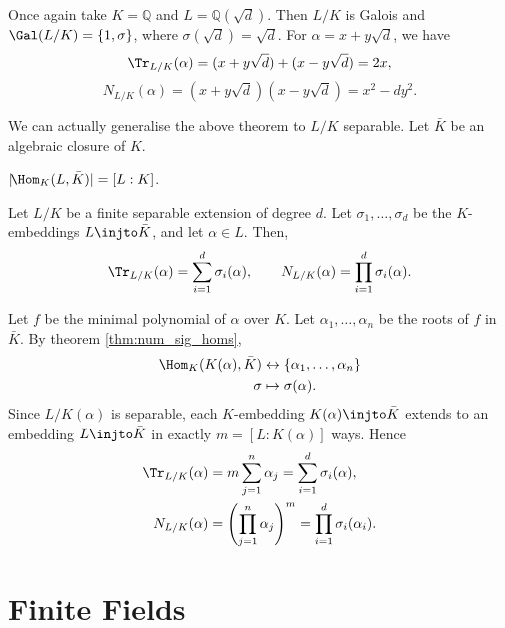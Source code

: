 \documentclass[12pt]{article}
\begin{document}
\begin{exbox}
	Once again take $K = \mathbb{Q}$ and $L = \mathbb{Q}(\sqrt d)$. Then $L/K$ is Galois and $\Gal(L/K) = \{1, \sigma\}$, where $\sigma(\sqrt d) = \sqrt d$. For $\alpha = x + y \sqrt d$, we have
	\[
	\Tr_{L/K}(\alpha) = (x + y \sqrt d) + (x - y \sqrt d) = 2x,
	\]
	\[
	N_{L/K}(\alpha) = (x + y \sqrt d)(x - y \sqrt d) = x^2 - dy^2.
	\]
\end{exbox}

We can actually generalise the above theorem to $L/K$ separable. Let $\bar K$ be an algebraic closure of $K$.


\begin{corollary}
	$|\!\Hom_K(L,\bar K)| = [L:K]$.
\end{corollary}

\begin{theorem}
	Let $L/K$ be a finite separable extension of degree $d$. Let $\sigma_1, \ldots, \sigma_d$ be the $K$-embeddings $L \injto \bar K$, and let $\alpha \in L$. Then,
	\[
	\Tr_{L/K}(\alpha) = \sum_{i = 1}^{d} \sigma_i(\alpha), \qquad N_{L/K}(\alpha) = \prod_{i = 1}^{d} \sigma_i(\alpha).
	\]
\end{theorem}

\begin{proofbox}
	Let $f$ be the minimal polynomial of $\alpha$ over $K$. Let $\alpha_1, \ldots, \alpha_n$ be the roots of $f$ in $\bar K$. By theorem \ref{thm:num_sig_homs},
	\begin{align*}
		\Hom_K(K(\alpha), \bar K) &\leftrightarrow \{\alpha_1, \ldots, \alpha_n\} \\
		\sigma &\mapsto \sigma(\alpha).
	\end{align*}
	Since $L/K(\alpha)$ is separable, each $K$-embedding $K(\alpha) \injto \bar K$ extends to an embedding $L \injto \bar K$ in exactly $m = [L:K(\alpha)]$ ways. Hence
	\begin{align*}
		\Tr_{L/K}(\alpha) &= m \sum_{j = 1}^{n} \alpha_j = \sum_{i = 1}^{d} \sigma_i(\alpha),\\
		N_{L/K}(\alpha) &= \Biggl( \prod_{j = 1}^{n} \alpha_j \Biggr)^{m} = \prod_{i = 1}^{d} \sigma_i(\alpha_i).
	\end{align*}
\end{proofbox}

\newpage

\section{Finite Fields}
\label{sec:fin_fields}
\end{document}
